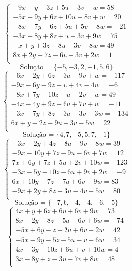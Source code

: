\documentclass[12pt,oneside,a4paper]{article}
\begin{document}
\vspace{\baselineskip}
\begin{equation*}
\begin{cases}
-9x-y+3z+5u+3v-w=58 \\
-5x-9y+6z+10u-8v+w=20 \\
-8x+7y-6z+5u+5v-8w=-21 \\
-3x+8y+8z+u+3v+9w=75 \\
-x+y+3z-8u-3v+8w=49 \\
8x+2y+7z-6u+3v+2w=1 \\
\end{cases}
\end{equation*}
\begin{equation*}
\text{Solução = }\{-5,-3,2,-1,5,6\}
\end{equation*}
\vspace{\baselineskip}
\begin{equation*}
\begin{cases}
-6x-2y+6z+3u-9v+w=-117 \\
-9x-6y-9z-u+4v-4w=-6 \\
-8x+7y-10z-u-2v-w=49 \\
-4x-4y+9z+6u+7v+w=-11 \\
-3x-7y+8z-3u-3v-3w=-134 \\
6x+y-2z-9u+3v-5w=22 \\
\end{cases}
\end{equation*}
\begin{equation*}
\text{Solução = }\{4,7,-5,5,7,-1\}
\end{equation*}
\vspace{\baselineskip}
\begin{equation*}
\begin{cases}
-3x-2y+4z-8u-9v+8w=39 \\
-9x-10y+7z-9u-6v+7w=12 \\
7x+6y+7z+5u+2v+10w=-123 \\
-3x-5y-10z-6u+9v+2w=-9 \\
6x+10y-7z-7u+6v-9w=83 \\
-9x+2y+8z+3u-4v-5w=80 \\
\end{cases}
\end{equation*}
\begin{equation*}
\text{Solução = }\{-7,6,-4,-4,-6,-5\}
\end{equation*}
\vspace{\baselineskip}
\begin{equation*}
\begin{cases}
4x+y+6z+6u+6v+9w=73 \\
8x-2y-8z+5u-6v+6w=-74 \\
-5x+6y-z-2u+6v+2w=42 \\
-5x-9y-5z-5u-v-6w=34 \\
4x-3y-10z+6u+v+10w=4 \\
3x-8y+z-3u-7v+8w=48 \\
\end{cases}
\end{equation*}
\end{document}
